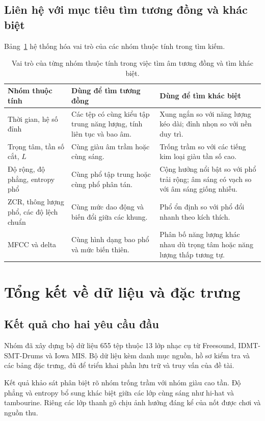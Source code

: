 \documentclass[11pt,a4paper]{article}
\begin{document}
\subsection{Liên hệ với mục tiêu tìm tương đồng và khác biệt}
Bảng~\ref{tab:vaitro} hệ thống hóa vai trò của các nhóm thuộc tính trong tìm kiếm.
\begin{table}[htbp]
\centering\small
\caption{Vai trò của từng nhóm thuộc tính trong việc tìm âm tương đồng và tìm khác biệt.}\label{tab:vaitro}
\begin{tabularx}{\textwidth}{p{}XX}
\toprule
Nhóm thuộc tính & Dùng để tìm tương đồng & Dùng để tìm khác biệt\\\midrule
Thời gian, hệ số đỉnh & Các tệp có cùng kiểu tập trung năng lượng, tính liên tục và bao âm. & Xung ngắn so với năng lượng kéo dài; đỉnh nhọn so với nền duy trì.\\
Trọng tâm, tần số cắt, $L$ & Cùng giàu âm trầm hoặc cùng sáng. & Trống trầm so với các tiếng kim loại giàu tần số cao.\\
Độ rộng, độ phẳng, entropy phổ & Cùng phổ tập trung hoặc cùng phổ phân tán. & Cộng hưởng nổi bật so với phổ trải rộng; âm sáng có vạch so với âm sáng giống nhiễu.\\
ZCR, thông lượng phổ, các độ lệch chuẩn & Cùng mức dao động và biến đổi giữa các khung. & Phổ ổn định so với phổ đổi nhanh theo kích thích.\\
MFCC và delta & Cùng hình dạng bao phổ và mức biến thiên. & Phân bố năng lượng khác nhau dù trọng tâm hoặc năng lượng thấp tương tự.\\\bottomrule
\end{tabularx}
\end{table}
\clearpage

\section{Tổng kết về dữ liệu và đặc trưng}\label{sec:tongket12}
\subsection{Kết quả cho hai yêu cầu đầu}
Nhóm đã xây dựng bộ dữ liệu 655 tệp thuộc 13 lớp nhạc cụ từ Freesound, IDMT-SMT-Drums và Iowa MIS. Bộ dữ liệu kèm danh mục nguồn, hồ sơ kiểm tra và các bảng đặc trưng, đủ để triển khai phần lưu trữ và truy vấn của đề tài.

Kết quả khảo sát phân biệt rõ nhóm trống trầm với nhóm giàu cao tần. Độ phẳng và entropy bổ sung khác biệt giữa các lớp cùng sáng như hi-hat và tambourine. Riêng các lớp thanh gõ chịu ảnh hưởng đáng kể của nốt được chơi và nguồn thu.
\end{document}
